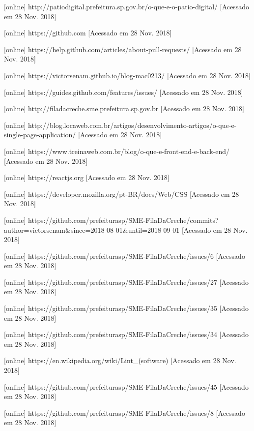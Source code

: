 \documentclass[a4paper, 11pt]{article} %
\begin{document}
\begin{thebibliography}{9}
[online] http://patiodigital.prefeitura.sp.gov.br/o-que-e-o-patio-digital/ [Acessado em 28 Nov. 2018]

[online] https://github.com [Acessado em 28 Nov. 2018]

[online] https://help.github.com/articles/about-pull-requests/ [Acessado em 28 Nov. 2018]

[online] https://victorsenam.github.io/blog-mac0213/ [Acessado em 28 Nov. 2018]

[online] https://guides.github.com/features/issues/ [Acessado em 28 Nov. 2018]

[online] http://filadacreche.sme.prefeitura.sp.gov.br [Acessado em 28 Nov. 2018]

[online] http://blog.locaweb.com.br/artigos/desenvolvimento-artigos/o-que-e-single-page-application/ [Acessado em 28 Nov. 2018]

[online] https://www.treinaweb.com.br/blog/o-que-e-front-end-e-back-end/ [Acessado em 28 Nov. 2018]

[online] https://reactjs.org [Acessado em 28 Nov. 2018]

[online] https://developer.mozilla.org/pt-BR/docs/Web/CSS [Acessado em 28 Nov. 2018]

[online] https://github.com/prefeiturasp/SME-FilaDaCreche/commits?author=victorsenam&since=2018-08-01&until=2018-09-01 [Acessado em 28 Nov. 2018]

[online] https://github.com/prefeiturasp/SME-FilaDaCreche/issues/6 [Acessado em 28 Nov. 2018]

[online] https://github.com/prefeiturasp/SME-FilaDaCreche/issues/27 [Acessado em 28 Nov. 2018]

[online] https://github.com/prefeiturasp/SME-FilaDaCreche/issues/35 [Acessado em 28 Nov. 2018]

[online] https://github.com/prefeiturasp/SME-FilaDaCreche/issues/34 [Acessado em 28 Nov. 2018]

[online] https://en.wikipedia.org/wiki/Lint\_(software) [Acessado em 28 Nov. 2018]

[online] https://github.com/prefeiturasp/SME-FilaDaCreche/issues/45 [Acessado em 28 Nov. 2018]

[online] https://github.com/prefeiturasp/SME-FilaDaCreche/issues/8 [Acessado em 28 Nov. 2018]


\end{thebibliography}
\end{document}
